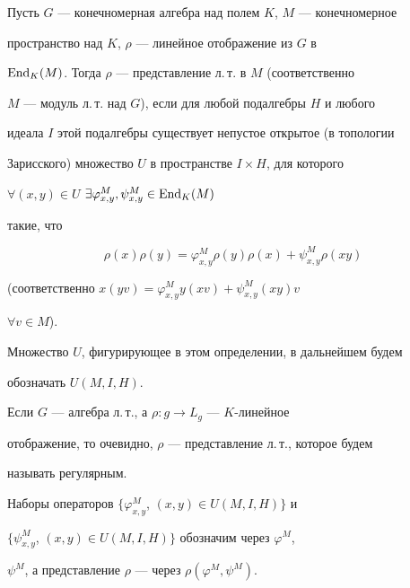 \begin{defn} 


Пусть $G$ --- конечномерная алгебра над полем $K$, $M$ --- конечномерное 


пространство над $K$, $\rho$ --- линейное отображение из $G$ в 


$\operatorname{End}_K(M)$. Тогда $\rho$ --- представление л.\,т. в $M$ (соответственно 


$M$ --- модуль л.\,т. над $G$), если для любой подалгебры $H$ и любого 


идеала $I$ этой подалгебры существует непустое открытое (в топологии 


Зарисского) множество $U$ в пространстве $I\times H$, для которого 


$\forall(x,y)\in U$ $\exists\varphi^M_{x,y},\psi^M_{x,y}\in\operatorname{End}_K(M)$ 


такие, что  


\begin{equation} 


\rho(x)\rho(y)=\varphi^M_{x,y}\rho(y)\rho(x)+ 


\psi^M_{x,y}\rho(xy) 


\end{equation} 


(соответственно $x(yv)=\varphi^M_{x,y}y(xv)+\psi^M_{x,y}(xy)v$ 


$\forall v\in M$). 


\end{defn} 


 


Множество $U$, фигурирующее в этом определении, в дальнейшем будем  


обозначать $U(M,I,H)$. 


 


Если $G$ --- алгебра л.\,т., а $\rho:g\to L_g$ --- $K$-линейное 


отображение, то очевидно, $\rho$ --- представление л.\,т., которое будем 


называть регулярным.  


 


Наборы операторов $\{\varphi^M_{x,y}$, $(x,y)\in U(M,I,H)\}$ и 


$\{\psi^M_{x,y}$, $(x,y)\in U(M,I,H)\}$ обозначим через $\varphi^M$, 


$\psi^M$, а представление $\rho$ --- через $\rho(\varphi^M,\psi^M)$.  


